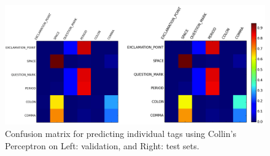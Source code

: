 \documentclass[twoside,12pt]{article}
\begin{document}
\begin{figure}[H]
\centering
\includegraphics[width=1.\textwidth]{./figs/figPerceptronConfMat.png}
\caption{Confusion matrix for predicting individual tags using Collin's Perceptron on Left: validation, and Right: test sets.}
\label{figPerceptronConfMat}
\end{figure}
\end{document}
